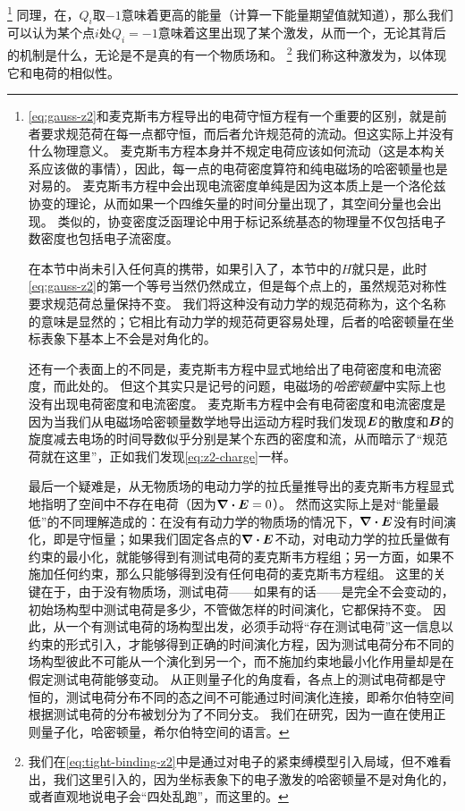 \footnote{
    \eqref{eq:gauss-z2}和麦克斯韦方程导出的电荷守恒方程有一个重要的区别，就是前者要求规范荷在每一点都守恒，而后者允许规范荷的流动。但这实际上并没有什么物理意义。
    麦克斯韦方程本身并不规定电荷应该如何流动（这是本构关系应该做的事情），因此，每一点的电荷密度算符和纯电磁场的哈密顿量也是对易的。
    麦克斯韦方程中会出现电流密度单纯是因为这本质上是一个洛伦兹协变的理论，从而如果一个四维矢量的时间分量出现了，其空间分量也会出现。
    类似的，协变密度泛函理论中用于标记系统基态的物理量不仅包括电子数密度也包括电子流密度。

    在本节中尚未引入任何真的携带，如果引入了，本节中的${H}$就只是，此时\eqref{eq:gauss-z2}的第一个等号当然仍然成立，但是每个点上的，虽然规范对称性要求规范荷总量保持不变。
    我们将这种没有动力学的规范荷称为，这个名称的意味是显然的；它相比有动力学的规范荷更容易处理，后者的哈密顿量在坐标表象下基本上不会是对角化的。

    还有一个表面上的不同是，麦克斯韦方程中显式地给出了电荷密度和电流密度，而此处的。
    但这个其实只是记号的问题，电磁场的\emph{哈密顿量}中实际上也没有出现电荷密度和电流密度。
    麦克斯韦方程中会有电荷密度和电流密度是因为当我们从电磁场哈密顿量数学地导出运动方程时我们发现$\vb*{E}$的散度和$\vb*{B}$的旋度减去电场的时间导数似乎分别是某个东西的密度和流，从而暗示了“规范荷就在这里”，正如我们发现\eqref{eq:z2-charge}一样。

    最后一个疑难是，从无物质场的电动力学的拉氏量推导出的麦克斯韦方程显式地指明了空间中不存在电荷（因为$\div{\vb*{E}} = 0$）。
    然而这实际上是对“能量最低”的不同理解造成的：在没有有动力学的物质场的情况下，$\div{\vb*{E}}$没有时间演化，即是守恒量；如果我们固定各点的$\div{\vb*{E}}$不动，对电动力学的拉氏量做有约束的最小化，就能够得到有测试电荷的麦克斯韦方程组；另一方面，如果不施加任何约束，那么只能够得到没有任何电荷的麦克斯韦方程组。
    这里的关键在于，由于没有物质场，测试电荷——如果有的话——是完全不会变动的，初始场构型中测试电荷是多少，不管做怎样的时间演化，它都保持不变。
    因此，从一个有测试电荷的场构型出发，必须手动将“存在测试电荷”这一信息以约束的形式引入，才能够得到正确的时间演化方程，因为测试电荷分布不同的场构型彼此不可能从一个演化到另一个，而不施加约束地最小化作用量却是在假定测试电荷能够变动。
    从正则量子化的角度看，各点上的测试电荷都是守恒的，测试电荷分布不同的态之间不可能通过时间演化连接，即希尔伯特空间根据测试电荷的分布被划分为了不同分支。
    我们在研究，因为一直在使用正则量子化，哈密顿量，希尔伯特空间的语言。
}%
同理，在，$Q_i$取$-1$意味着更高的能量（计算一下能量期望值就知道），那么我们可以认为某个点$i$处$Q_i=-1$意味着这里出现了某个激发，从而一个，无论其背后的机制是什么，无论是不是真的有一个物质场和。%
\footnote{
    我们在\eqref{eq:tight-binding-z2}中是通过对电子的紧束缚模型引入局域，但不难看出，我们这里引入的，因为坐标表象下的电子激发的哈密顿量不是对角化的，或者直观地说电子会“四处乱跑”，而这里的。
}%
我们称这种激发为，以体现它和电荷的相似性。


